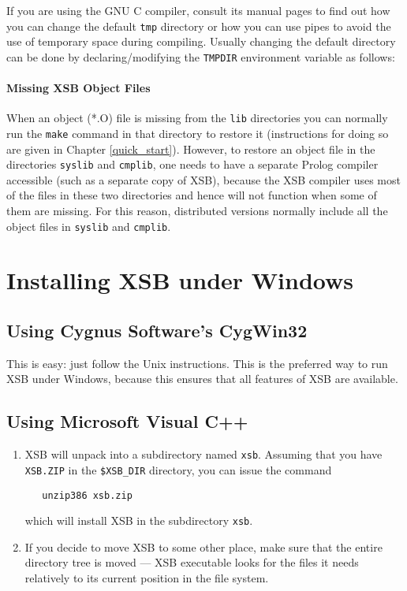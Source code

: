 
\noindent
If you are using the GNU C compiler, consult its manual pages
to find out how you can change the default {\tt tmp} directory or how you
can use pipes to avoid the use of temporary space during compiling.
Usually changing the default directory can be done by declaring/modifying
the {\tt TMPDIR} environment variable as follows:


\paragraph*{Missing XSB Object Files}
When an object (*.O) file is missing from the {\tt lib} directories you can
normally run the {\tt make} command  in that directory to restore it
(instructions for doing so are given in Chapter
\ref{quick_start}).  However, to restore an object file in the
directories {\tt syslib} and {\tt cmplib}, one needs to have a
separate Prolog compiler accessible (such as a separate copy of
XSB), because the XSB compiler uses most of the files in these
two directories and hence will not function when some of them are
missing.  For this reason, distributed versions normally include all
the object files in {\tt syslib} and {\tt cmplib}.

\section{Installing XSB under Windows}
\subsection{Using Cygnus Software's \mbox{CygWin32}}
\label{quick:cygwin}

This is easy: just follow the Unix instructions. This is the preferred way to
run XSB under Windows, because this ensures that all features of XSB are
available.


\subsection{Using Microsoft Visual C++}
\label{quick:DOS}

\begin{enumerate}
\item 
   XSB will unpack into a subdirectory named {\tt xsb}.
   Assuming that you have {\tt XSB.ZIP} in the {\tt \$XSB\_DIR} directory,
   you can issue the command
\begin{verbatim}
   unzip386 xsb.zip
\end{verbatim}
   which will install XSB in the subdirectory {\tt xsb}.

 \item If you decide to move XSB to some other place, make sure that the
   entire directory tree is moved --- XSB executable looks for the files it
   needs relatively to its current position in the file system.

\end{enumerate}


